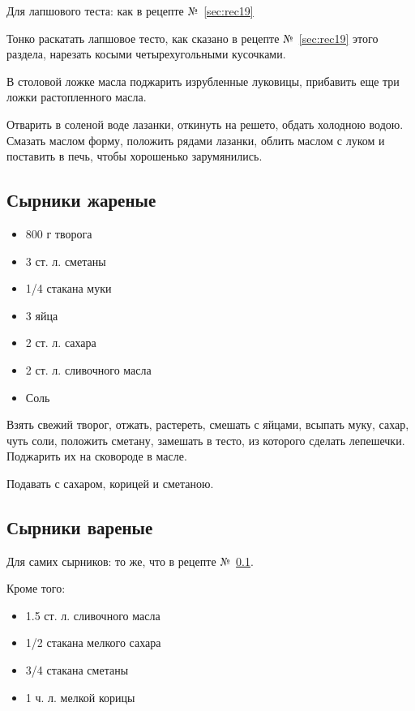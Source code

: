 Для лапшового теста: как в рецепте №~\ref{sec:rec19}

Тонко раскатать лапшовое тесто, как сказано в рецепте №~\ref{sec:rec19} этого раздела, нарезать косыми четырехугольными кусочками.

В столовой ложке масла поджарить изрубленные луковицы, прибавить еще три ложки растопленного масла.

Отварить в соленой воде лазанки, откинуть на решето, обдать холодною водою. Смазать маслом форму, положить рядами лазанки, облить маслом с луком и поставить в печь, чтобы хорошенько зарумянились.

\subsection{Сырники жареные}\label{sec:rec25}

\begin{itemize}
	\item 800 г творога
    \item 3 ст. л. сметаны
    \item 1/4 стакана муки
    \item 3 яйца 
    \item 2 ст. л. сахара
    \item 2 ст. л. сливочного масла 
    \item Соль
\end{itemize}

Взять свежий творог, отжать, растереть, смешать с яйцами, всыпать муку, сахар, чуть соли, положить сметану, замешать в тесто, из которого сделать лепешечки. Поджарить их на сковороде в масле.

Подавать с сахаром, корицей и сметаною.

\subsection{Сырники вареные}

Для самих сырников: то же, что в рецепте №~\ref{sec:rec25}.

Кроме того: 

\begin{itemize}
	\item 1.5 ст. л. сливочного масла 
    \item 1/2 стакана мелкого сахара 
    \item 3/4 стакана сметаны
    \item 1 ч. л. мелкой корицы
\end{itemize}

